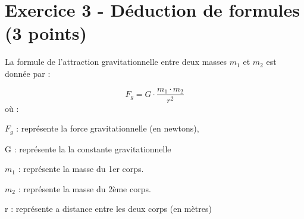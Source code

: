 \documentclass[answers]{exam}
\begin{document}
\section*{Exercice 3 - Déduction de formules (3 points)}

La formule de l'attraction gravitationnelle entre deux masses $m_1$ et $m_2$ est donnée par :

\[
F_g = G \cdot \frac{m_1 \cdot m_2}{r^2}
\]
où :
\begin{addmargin}[4em]{1em}
  \begin{compactitem}
      \item [$F_g$]: représente la force gravitationnelle (en newtons),
      \item [G]: représente la la constante gravitationnelle
      \item [$m_1$]: représente la masse du 1er corps.
      \item [$m_2$]: représente la masse du 2ème corps.
      \item [r]: représente a distance entre les deux corps (en mètres)
  \end{compactitem}
  \end{addmargin}
\end{document}
